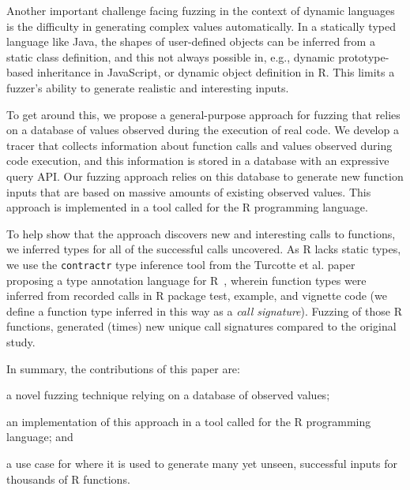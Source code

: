\documentclass[sigplan,anonymous,review]{acmart}
\begin{document}
Another important challenge facing fuzzing in the context of dynamic languages is the difficulty in generating complex values automatically.
In a statically typed language like Java, the shapes of user-defined objects can be inferred from a static class definition, and this not always possible in, e.g., dynamic prototype-based inheritance in JavaScript, or dynamic object definition in R.
This limits a fuzzer's ability to generate realistic and interesting inputs.

To get around this, we propose a general-purpose approach for fuzzing that relies on a database of values observed during the execution of real code.
We develop a tracer that collects information about function calls and values observed during code execution, and this information is stored in a database with an expressive query API.
Our fuzzing approach relies on this database to generate new function inputs that are based on massive amounts of existing observed values.
This approach is implemented in a tool called \tool for the R programming language.

To help show that the approach discovers new and interesting calls to functions, we inferred types for all of the successful calls \tool uncovered.
As R lacks static types, we use the {\tt contractr} type inference tool from the Turcotte et al. paper proposing a type annotation language for R~\cite{turcotte2020designing}, wherein function types were inferred from recorded calls in R package test, example, and vignette code (we define a function type inferred in this way as a \textit{call signature}).
Fuzzing \UFNumFunctions of those R functions, \tool generated \UFSignatrSignaturesRnd (\UFSignatrBaselineSignaturesRatio times) new unique call signatures compared to the original study.



In summary, the contributions of this paper are:
%
\begin{inparaenum}[(1)]
    \item a novel fuzzing technique relying on a database of observed values;
    \item an implementation of this approach in a tool called \tool for the R programming language; and
    \item a use case for \tool where it is used to generate many yet unseen, successful inputs for thousands of R functions.
\end{inparaenum} 
\end{document}
